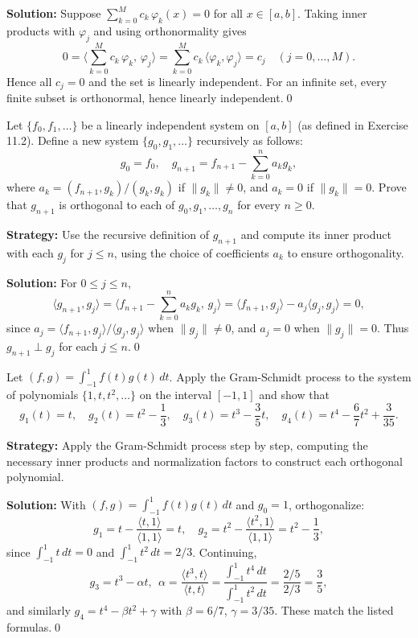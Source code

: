 \bigskip\noindent\textbf{Solution:}
Suppose $\sum_{k=0}^M c_k\,\varphi_k(x)=0$ for all $x\in[a,b]$. Taking inner products with $\varphi_j$ and using orthonormality gives
\[
0 = \Big\langle \sum_{k=0}^M c_k\,\varphi_k,\,\varphi_j\Big\rangle = \sum_{k=0}^M c_k\,\langle\varphi_k,\varphi_j\rangle = c_j\quad (j=0,\dots,M).
\]
Hence all $c_j=0$ and the set is linearly independent. For an infinite set, every finite subset is orthonormal, hence linearly independent.\qed


\begin{problembox}
Let $\{f_0, f_1, \dots\}$ be a linearly independent system on $[a, b]$ (as defined in Exercise 11.2). Define a new system $\{g_0, g_1, \dots\}$ recursively as follows:
\[
g_0 = f_0, \quad g_{n+1} = f_{n+1} - \sum_{k=0}^n a_k g_k,
\]
where $a_k = (f_{n+1}, g_k)/(g_k, g_k)$ if $\|g_k\| \neq 0$, and $a_k = 0$ if $\|g_k\| = 0$. Prove that $g_{n+1}$ is orthogonal to each of $g_0, g_1, \dots, g_n$ for every $n \geq 0$.
\end{problembox}

\noindent\textbf{Strategy:} Use the recursive definition of $g_{n+1}$ and compute its inner product with each $g_j$ for $j \leq n$, using the choice of coefficients $a_k$ to ensure orthogonality.

\bigskip\noindent\textbf{Solution:}
For $0\le j\le n$,
\[
\langle g_{n+1}, g_j\rangle = \Big\langle f_{n+1} - \sum_{k=0}^n a_k g_k,\, g_j\Big\rangle = \langle f_{n+1}, g_j\rangle - a_j\langle g_j, g_j\rangle = 0,
\]
since $a_j = \langle f_{n+1}, g_j\rangle/\langle g_j, g_j\rangle$ when $\|g_j\|\neq 0$, and $a_j=0$ when $\|g_j\|=0$. Thus $g_{n+1}\perp g_j$ for each $j\le n$.\qed


\begin{problembox}
Let $(f, g) = \int_{-1}^1 f(t)g(t) \, dt$. Apply the Gram-Schmidt process to the system of polynomials $\{1, t, t^2, \dots\}$ on the interval $[-1, 1]$ and show that
\[
g_1(t) = t, \quad g_2(t) = t^2 - \frac{1}{3}, \quad g_3(t) = t^3 - \frac{3}{5}t, \quad g_4(t) = t^4 - \frac{6}{7}t^2 + \frac{3}{35}.
\]
\end{problembox}

\noindent\textbf{Strategy:} Apply the Gram-Schmidt process step by step, computing the necessary inner products and normalization factors to construct each orthogonal polynomial.

\bigskip\noindent\textbf{Solution:}
With $(f,g)=\int_{-1}^1 f(t)g(t)\,dt$ and $g_0=1$, orthogonalize:
\[
g_1 = t - \frac{\langle t,1\rangle}{\langle 1,1\rangle} = t,\quad
g_2 = t^2 - \frac{\langle t^2,1\rangle}{\langle 1,1\rangle} = t^2 - \frac{1}{3},
\]
since $\int_{-1}^1 t\,dt=0$ and $\int_{-1}^1 t^2\,dt=2/3$. Continuing,
\[
g_3 = t^3 - \alpha t,\ \ \alpha = \frac{\langle t^3, t\rangle}{\langle t,t\rangle} = \frac{\int_{-1}^1 t^4\,dt}{\int_{-1}^1 t^2\,dt} = \frac{2/5}{2/3} = \frac{3}{5},
\]
and similarly $g_4 = t^4 - \beta t^2 + \gamma$ with $\beta=6/7$, $\gamma=3/35$. These match the listed formulas.\qed


